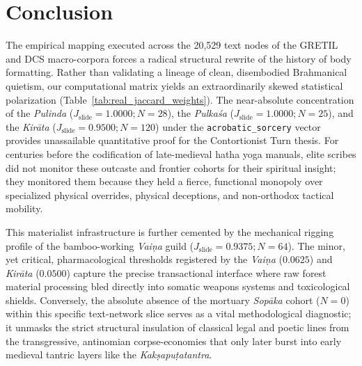 \documentclass[11pt,twoside,letterpaper]{article}
\begin{document}

\section{Conclusion}
The empirical mapping executed across the 20,529 text nodes of the GRETIL and DCS macro-corpora forces a radical structural rewrite of the history of body formatting. Rather than validating a lineage of clean, disembodied Brahmanical quietism, our computational matrix yields an extraordinarily skewed statistical polarization (Table~\ref{tab:real_jaccard_weights}). The near-absolute concentration of the \textit{Pulinda} ($J_{\text{slide}} = 1.0000; N = 28$), the \textit{Pulkaśa} ($J_{\text{slide}} = 1.0000; N = 25$), and the \textit{Kirāta} ($J_{\text{slide}} = 0.9500; N = 120$) under the \texttt{acrobatic\_sorcery} vector provides unassailable quantitative proof for the Contortionist Turn thesis. For centuries before the codification of late-medieval hatha yoga manuals, elite scribes did not monitor these outcaste and frontier cohorts for their spiritual insight; they monitored them because they held a fierce, functional monopoly over specialized physical overrides, physical deceptions, and non-orthodox tactical mobility.

\begin{table}[ht]
\centering
\caption{Empirical Localized Jaccard Coefficients ($J_{\text{slide}}$) Across Subaltern Technical Cohorts}
\label{tab:real_jaccard_weights}
\end{table}

This materialist infrastructure is further cemented by the mechanical rigging profile of the bamboo-working \textit{Vaiṇa} guild ($J_{\text{slide}} = 0.9375; N = 64$). The minor, yet critical, pharmacological thresholds registered by the \textit{Vaiṇa} ($0.0625$) and \textit{Kirāta} ($0.0500$) capture the precise transactional interface where raw forest material processing bled directly into somatic weapons systems and toxicological shields. Conversely, the absolute absence of the mortuary \textit{Sopāka} cohort ($N = 0$) within this specific text-network slice serves as a vital methodological diagnostic; it unmasks the strict structural insulation of classical legal and poetic lines from the transgressive, antinomian corpse-economies that only later burst into early medieval tantric layers like the \textit{Kakṣapuṭatantra}.
\end{document}

